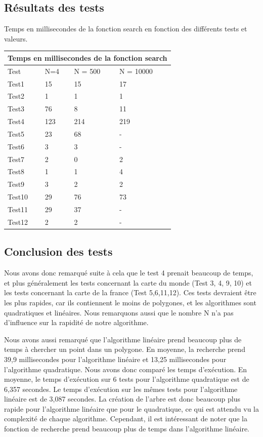 \documentclass[utf8]{article}
\begin{document}
\begin{large}
\subsection{Résultats des tests}
\par
\indent
Temps en millisecondes de la fonction search en fonction des différents tests et valeurs.

\begin{tabular}{ |p{3cm}||p{3cm}|p{3cm}|p{3cm}|  }
 \hline
 \multicolumn{4}{|c|}{Temps en millisecondes de la fonction search} \\
 \hline
 Test & N=4 & N = 500 & N = 10000\\
 \hline
 Test1   & 15    & 15&   17\\
 Test2 &   1  & 1   & 1\\
 Test3 & 76 & 8&  11\\
 Test4    & 123 & 214&  219\\
 Test5 & 23& 68 & -\\
 Test6 & 3& 3 & -\\
 Test7 &   2  & 0& 2\\
 Test8 & 1  & 1   & 4\\
 Test9& 3  & 2& 2\\
 Test10& 29 & 76 & 73\\
 Test11 &29 &37& -\\
 Test12 & 2&2& -\\
 \hline
\end{tabular}

\subsection{Conclusion des tests}
\par
\indent
Nous avons donc remarqué suite à cela que le test 4 prenait beaucoup de temps,
et plus généralement les tests concernant la carte du monde (Test 3, 4, 9, 10)
et les tests concernant la carte de la france (Test 5,6,11,12). Ces tests
devraient être les plus rapides, car ils contiennent le moins de polygones, et
les algorithmes sont quadratiques et linéaires. Nous remarquons aussi que le
nombre N n'a pas d'influence sur la rapidité de notre algorithme.
\par
\indent
Nous avons aussi remarqué que l'algorithme linéaire prend beaucoup plus de temps
à chercher un point dans un polygone. En moyenne, la recherche prend 39,9
millisecondes pour l'algorithme linéaire et 13,25 millisecondes pour
l'algorithme quadratique. Nous avons donc comparé les temps d'exécution. En
moyenne, le temps d'exécution sur 6 tests pour l'algorithme quadratique est de
6,357 secondes. Le temps d'exécution sur les mêmes tests pour l'algorithme
linéaire est de 3,087 secondes. La création de l'arbre est donc beaucoup plus
rapide pour l'algorithme linéaire que pour le quadratique, ce qui est attendu vu
la complexité de chaque algorithme. Cependant, il est intéressant de noter que
la fonction de recherche prend beaucoup plus de temps dans l'algorithme
linéaire.
\par


\end{large}
\end{document}
